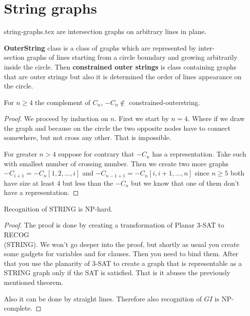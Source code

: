 \chapter{String graphs}

\begin{defn}
	string-graphs.tex are intersection graphs on arbitrary lines in plane.
\end{defn}

\begin{defn}
	\textbf{OuterString} class is a class of graphs which are represented by inter-\\section graphs of lines starting from a circle boundary and growing arbitrarily inside the circle. Then \textbf{constrained outer strings} is class containing graphs that are outer strings but also it is determined the order of lines appearance on the circle.
\end{defn}


\begin{thm}
	For $n \geq 4$ the complement of $C_n$, $-C_n \notin$ constrained-outerstring.
\end{thm}

\begin{proof}
	We proceed by induction on $n$. First we start by $n = 4$. Where if we draw the graph and because on the circle the two opposite nodes have to connect somewhere, but not cross any other. That is impossible.
	
	For greater $n > 4$ suppose for contrary that $-C_n$ has a representation. Take such with smallest number of crossing number. Then we create two more graphs $-C_{i+1} = -C_n[1,2, \dots, i]$ and $-C_{n-1+1} = -C_n[i, i+1, \dots, n]$ since $n \geq 5$ both have size at least $4$ but less than the $-C_n$ but we know that one of them don't have a representation.
\end{proof}

\begin{thm}
	Recognition of STRING is NP-hard.
\end{thm}

\begin{proof}
	The proof is done by creating a transformation of Planar 3-SAT to RECOG\\(STRING). We won't go deeper into the proof, but shortly as usual you create some gadgets for variables and for clauses. Then you need to bind them. After that you use the planarity of 3-SAT to create a graph that is representable as a STRING graph only if the SAT is satisfied. That is it abuses the previously mentioned theorem.
	
	Also it can be done by straight lines. Therefore also recognition of $GI$ is NP-complete.
\end{proof}

